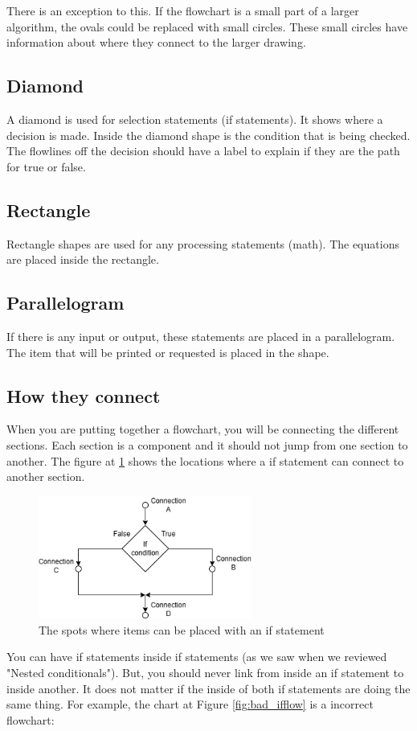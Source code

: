 There is an exception to this. If the flowchart
is a small part of a larger algorithm, the ovals could be replaced with small circles. These small circles have information about where they connect to the larger drawing.
\subsection{Diamond}
A diamond is used for selection statements (if statements). It shows where a decision is made. Inside the diamond shape is the condition that is being checked. The flowlines off the decision should have a label to explain if they are the path for true or false. 
\subsection{Rectangle}
Rectangle shapes are used for any processing statements (math). The equations are placed inside the rectangle.
\subsection{Parallelogram}
If there is any input or output, these statements are placed in a parallelogram. The
item that will be printed or requested is placed in the shape.
\subsection{How they connect}
When you are putting together a flowchart, you will be connecting the
different sections. Each section is a component and it should not jump from one section to another. The figure at \ref{fig:if_connect} shows the locations
where a if statement can connect to another section.
\begin{figure}[h]
    \centering
    \includegraphics[width=7cm]{images/ifconnect.png}
    \caption{The spots where items can be placed with an if statement}
    \label{fig:if_connect}
\end{figure}
You can have if statements inside if statements (as we saw when we reviewed "Nested conditionals"). But, you should never link from inside an if statement to inside another. It does not matter if the
inside of both if statements are doing the same thing. For example, the chart at Figure \ref{fig:bad_ifflow} is a incorrect flowchart:

